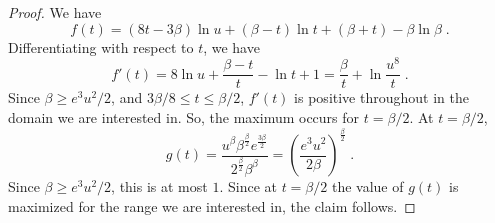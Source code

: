 {\begin{proof}
\noindent We have
\[
f(t)=(8t-3\beta) \ln u + (\beta-t)\ln t+ (\beta+t)-\beta\ln \beta\;.    
\]
Differentiating with respect to $t$, we have
\[
f'(t)= 8\ln u+ \frac{\beta-t}{t}-\ln t +1 = \frac{\beta}{t}+\ln \frac{u^8}{t}\;.
\]
Since $\beta\geq {e^3u^2}/{2}$, and ${3\beta}/{8}\leq t\leq {\beta}/{2}$, $f'(t)$ is positive throughout in the domain we are interested in. So, the maximum occurs for $t={\beta}/{2}$. At $t={\beta}/{2}$, 
\[g(t)=\frac{u^\beta \beta^{\frac{\beta}{2}}e^{\frac{3\beta}{2}}}{2^{\frac{\beta}{2}}\beta^{\beta}}=\left(\frac{e^3u^2}{2\beta}\right)^{\frac{\beta}{2}}\;.\]
Since $\beta\geq {e^3u^2}/{2}$, this is at most $1$. Since at $t={\beta}/{2}$ the value of $g(t)$ is maximized for the range we are interested in, the claim follows.
\end{proof}
}
\ifnum{}
\proofremclaims
\fi
